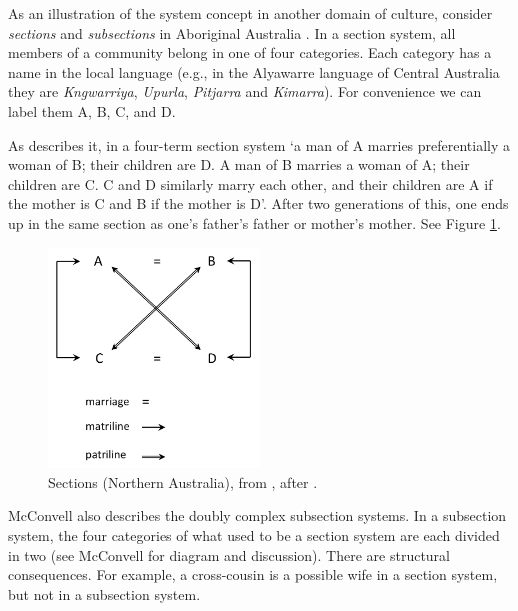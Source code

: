 \newpage
As an illustration of the system concept in another domain of culture, consider \textit{sections} 
and \textit{subsections} in Aboriginal Australia \citep{radcliffe-brown_social_1931}. In a 
section system, all members of a community belong in one of four 
categories. Each category has a name in the local language (e.g., in the 
Alyawarre language of Central Australia they are \textit{Kngwarriya}, 
\textit{Upurla}, \textit{Pitjarra} and \textit{Kimarra}). For convenience we can label them A, B, C, and D. 



As \citet[2]{mcconvell_origin_1985} describes it, in a four-term section system \textquoteleft a man 
of A marries preferentially a woman of B; their children are D. A man of 
B marries a woman of A; their children are C. C and D similarly marry 
each other, and their children are A if the mother is C and B if the 
mother is D'. After two generations of this, one ends up in the same 
section as one's father's father or mother's mother. See Figure \ref{sections}.

\begin{figure}[h]
\includegraphics[width=0.5\textwidth,keepaspectratio]{figures/Fig05}
\caption{Sections (Northern Australia), from \citet[32]{mcconvell_origin_1985}, after 
\citet{radcliffe-brown_social_1931}. }
\label{sections}
\end{figure}







McConvell also describes the doubly complex subsection systems. In a subsection system, the four categories of what used to be a section system are each divided in 
two (see McConvell for diagram and discussion). There are structural 
consequences. For example, a cross-cousin is a possible wife in a 
section system, but not in a subsection system. 



